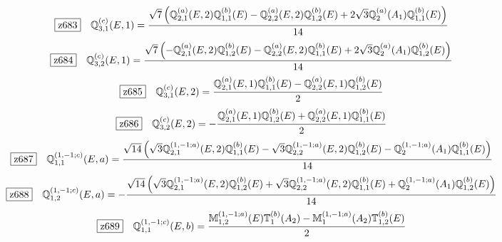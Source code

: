 \documentclass[fleqn,10pt,landscape]{jsarticle}
\begin{document}
\begin{dmath*}
\hspace*{3mm}\fbox{z683}\quad \mathbb{Q}_{3,1}^{(c)}(E,1)=\frac{\sqrt{7} \left(\mathbb{Q}_{2,1}^{(a)}(E,2) \mathbb{Q}_{1,1}^{(b)}(E) - \mathbb{Q}_{2,2}^{(a)}(E,2) \mathbb{Q}_{1,2}^{(b)}(E) + 2 \sqrt{3} \mathbb{Q}_{2}^{(a)}(A_{1}) \mathbb{Q}_{1,1}^{(b)}(E)\right)}{14}
\end{dmath*}
\begin{dmath*}
\hspace*{3mm}\fbox{z684}\quad \mathbb{Q}_{3,2}^{(c)}(E,1)=\frac{\sqrt{7} \left(- \mathbb{Q}_{2,1}^{(a)}(E,2) \mathbb{Q}_{1,2}^{(b)}(E) - \mathbb{Q}_{2,2}^{(a)}(E,2) \mathbb{Q}_{1,1}^{(b)}(E) + 2 \sqrt{3} \mathbb{Q}_{2}^{(a)}(A_{1}) \mathbb{Q}_{1,2}^{(b)}(E)\right)}{14}
\end{dmath*}
\begin{dmath*}
\hspace*{3mm}\fbox{z685}\quad \mathbb{Q}_{3,1}^{(c)}(E,2)=\frac{\mathbb{Q}_{2,1}^{(a)}(E,1) \mathbb{Q}_{1,1}^{(b)}(E) - \mathbb{Q}_{2,2}^{(a)}(E,1) \mathbb{Q}_{1,2}^{(b)}(E)}{2}
\end{dmath*}
\begin{dmath*}
\hspace*{3mm}\fbox{z686}\quad \mathbb{Q}_{3,2}^{(c)}(E,2)=- \frac{\mathbb{Q}_{2,1}^{(a)}(E,1) \mathbb{Q}_{1,2}^{(b)}(E) + \mathbb{Q}_{2,2}^{(a)}(E,1) \mathbb{Q}_{1,1}^{(b)}(E)}{2}
\end{dmath*}
\begin{dmath*}
\hspace*{3mm}\fbox{z687}\quad \mathbb{Q}_{1,1}^{(1,-1;c)}(E,a)=\frac{\sqrt{14} \left(\sqrt{3} \mathbb{Q}_{2,1}^{(1,-1;a)}(E,2) \mathbb{Q}_{1,1}^{(b)}(E) - \sqrt{3} \mathbb{Q}_{2,2}^{(1,-1;a)}(E,2) \mathbb{Q}_{1,2}^{(b)}(E) - \mathbb{Q}_{2}^{(1,-1;a)}(A_{1}) \mathbb{Q}_{1,1}^{(b)}(E)\right)}{14}
\end{dmath*}
\begin{dmath*}
\hspace*{3mm}\fbox{z688}\quad \mathbb{Q}_{1,2}^{(1,-1;c)}(E,a)=- \frac{\sqrt{14} \left(\sqrt{3} \mathbb{Q}_{2,1}^{(1,-1;a)}(E,2) \mathbb{Q}_{1,2}^{(b)}(E) + \sqrt{3} \mathbb{Q}_{2,2}^{(1,-1;a)}(E,2) \mathbb{Q}_{1,1}^{(b)}(E) + \mathbb{Q}_{2}^{(1,-1;a)}(A_{1}) \mathbb{Q}_{1,2}^{(b)}(E)\right)}{14}
\end{dmath*}
\begin{dmath*}
\hspace*{3mm}\fbox{z689}\quad \mathbb{Q}_{1,1}^{(1,-1;c)}(E,b)=\frac{\mathbb{M}_{1,2}^{(1,-1;a)}(E) \mathbb{T}_{1}^{(b)}(A_{2}) - \mathbb{M}_{1}^{(1,-1;a)}(A_{2}) \mathbb{T}_{1,2}^{(b)}(E)}{2}
\end{dmath*}
\end{document}
